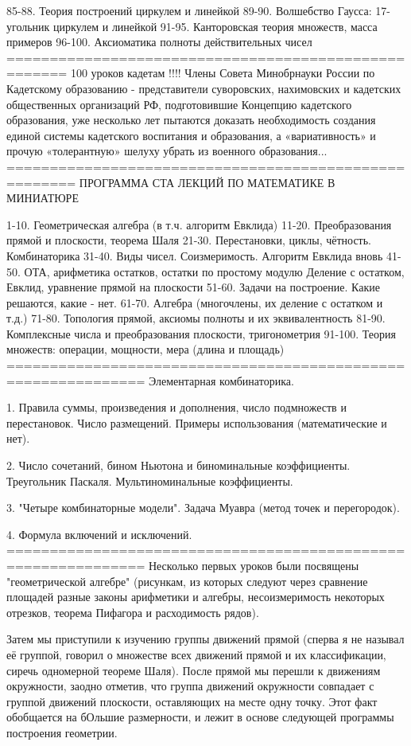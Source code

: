 85-88. Теория построений циркулем и линейкой
89-90. Волшебство Гаусса: 17-угольник циркулем и линейкой
91-95. Канторовская теория множеств, масса примеров
96-100. Аксиоматика полноты действительных чисел
=====================================================
100 уроков кадетам !!!!
 Члены Совета Минобрнауки России по Кадетскому образованию - представители суворовских, нахимовских и кадетских общественных организаций РФ, подготовившие Концепцию кадетского образования, уже несколько лет пытаются доказать необходимость создания единой системы кадетского воспитания и образования, а «вариативность» и прочую «толерантную» шелуху убрать из военного образования...
======================================================
ПРОГРАММА СТА ЛЕКЦИЙ ПО МАТЕМАТИКЕ В МИНИАТЮРЕ

1-10. Геометрическая алгебра (в т.ч. алгоритм Евклида)
11-20. Преобразования прямой и плоскости, теорема Шаля
21-30. Перестановки, циклы, чётность. Комбинаторика
31-40. Виды чисел. Соизмеримость. Алгоритм Евклида вновь
41-50. ОТА, арифметика остатков, остатки по простому модулю
   Деление с остатком, Евклид, уравнение прямой на плоскости
51-60. Задачи на построение. Какие решаются, какие - нет.
61-70. Алгебра (многочлены, их деление с остатком и т.д.)
71-80. Топология прямой, аксиомы полноты и их эквивалентность
81-90. Комплексные числа и преобразования плоскости, тригонометрия
91-100. Теория множеств: операции, мощности, мера (длина и площадь)
==============================================================
Элементарная комбинаторика.

1. Правила суммы, произведения и дополнения, число подмножеств и перестановок. 
Число размещений. Примеры использования (математические и нет).

2. Число сочетаний, бином Ньютона и биноминальные коэффициенты. 
Треугольник Паскаля. Мультиноминальные коэффициенты.

3. "Четыре комбинаторные модели". 
Задача Муавра (метод точек и перегородок).

4. Формула включений и исключений.
==============================================================
Несколько первых уроков были посвящены "геометрической алгебре" (рисункам, из
которых следуют через сравнение площадей разные законы арифметики и алгебры,
несоизмеримость некоторых отрезков, теорема Пифагора и расходимость рядов).

Затем мы приступили к изучению группы движений прямой (сперва я не называл её
группой, говорил о множестве всех движений прямой и их классификации, сиречь
одномерной теореме Шаля). После прямой мы перешли к движениям окружности,
заодно отметив, что группа движений окружности совпадает с группой движений
плоскости, оставляющих на месте одну точку. Этот факт обобщается на бОльшие
размерности, и лежит в основе следующей программы построения геометрии.

